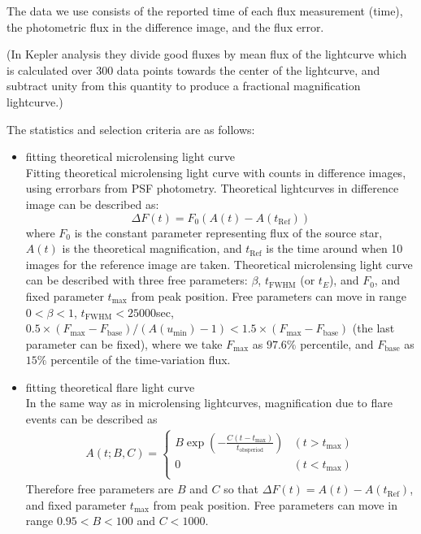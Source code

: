 \documentclass[iop, apj]{emulateapj}
\newcommand{\?}{\stackrel{?}{=}}
\begin{document}
The data we use consists of the reported time of each flux measurement (time), 
the photometric flux in the difference image, and the flux error. 

(In Kepler analysis they divide good fluxes by mean flux of the lightcurve 
which is calculated over 300 data points towards the center of the lightcurve, 
and subtract unity from this quantity to produce a fractional magnification lightcurve.)


The statistics and selection criteria are as follows:
%
\begin{itemize}
%
\item{fitting theoretical microlensing light curve}\\
Fitting theoretical microlensing light curve with counts in difference images, using errorbars from PSF photometry. 
Theoretical lightcurves in difference image can be described as:
%
\begin{equation}
\Delta F (t)= F_0 (A(t) - A(t_\mathrm{Ref}))
\label{eq:chi2dof}
\end{equation}
%
where $F_0$ is the constant parameter representing flux of the source star, 
$A(t)$ is the theoretical magnification, and  
$t_\mathrm{Ref}$ is the time around when 10 images for the reference image are taken. 
Theoretical microlensing light curve can be described %
with three free parameters: $\beta$, $t_\mathrm{FWHM}$ (or $t_E$), and $F_0$,
and fixed parameter $t_\mathrm{max}$ from peak position. 
Free parameters can move in range $0<\beta<1$, $t_\mathrm{FWHM}<25000$sec, 
$0.5 \times (F_\mathrm{max}-F_\mathrm{base})/(A(u_\mathrm{min})-1)<1.5\times (F_\mathrm{max}-F_\mathrm{base})$ 
(the last parameter can be fixed), 
where we take $F_\mathrm{max}$ as $97.6\%$ percentile, and $F_\mathrm{base}$ as $15\%$ percentile of the time-variation flux. 

\item{fitting theoretical flare light curve}\\
In the same way as in microlensing lightcurves, magnification due to flare events can be described as
%
\begin{eqnarray}
A (t;B,C)=\left\{\begin{array}{ll}
 B \exp\left(-\frac{C (t-t_\mathrm{max})}{t_\mathrm{obsperiod}}\right) & (t>t_\mathrm{max})\\
 0  & (t<t_\mathrm{max})\\
\end{array}\right.
\label{eq:expflare}
\end{eqnarray}
%
Therefore free parameters are $B$ and $C$ so that $\Delta F (t)= A(t) - A(t_\mathrm{Ref})$, %
and fixed parameter $t_\mathrm{max}$ from peak position. 
Free parameters can move in range $0.95<B<100$ and $C<1000$.  


\end{itemize}
\end{document}

